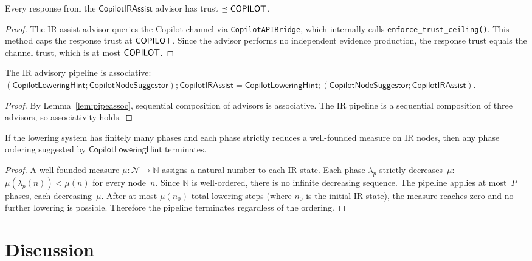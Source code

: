 \documentclass[11pt]{article}
\newcommand{\LowHint}{\mathsf{CopilotLoweringHint}}
\newcommand{\NodeSugg}{\mathsf{CopilotNodeSuggestor}}
\newcommand{\IRAssist}{\mathsf{CopilotIRAssist}}
\begin{document}
\begin{theorem}%
\label{thm:irassistceil}
Every response from the $\IRAssist$ advisor has trust
$\preceq \mathsf{COPILOT}$.
\end{theorem}
\begin{proof}
The IR assist advisor queries the Copilot channel via
\texttt{CopilotAPIBridge}, which internally calls
\texttt{enforce\_trust\_ceiling()}.  This method caps
the response trust at $\mathsf{COPILOT}$.  Since the advisor
performs no independent evidence production, the response
trust equals the channel trust, which is at most $\mathsf{COPILOT}$.
\end{proof}

\begin{theorem}%
\label{thm:compassoc}
The IR advisory pipeline is associative:
$(\LowHint \mathbin{;} \NodeSugg) \mathbin{;} \IRAssist
= \LowHint \mathbin{;} (\NodeSugg \mathbin{;} \IRAssist)$.
\end{theorem}
\begin{proof}
By Lemma~\ref{lem:pipeassoc}, sequential composition
of advisors is associative.  The IR pipeline is a
sequential composition of three advisors, so
associativity holds.
\end{proof}

\begin{theorem}%
\label{thm:phaseconv}
If the lowering system has finitely many phases and each
phase strictly reduces a well-founded measure on IR nodes,
then any phase ordering suggested by $\LowHint$ terminates.
\end{theorem}
\begin{proof}
A well-founded measure $\mu \colon \mathcal{N} \to \mathbb{N}$
assigns a natural number to each IR state.  Each phase
$\lambda_p$ strictly decreases~$\mu$:
$\mu(\lambda_p(n)) < \mu(n)$ for every node~$n$.
Since $\mathbb{N}$ is well-ordered, there is no infinite
decreasing sequence.  The pipeline applies at most~$P$
phases, each decreasing~$\mu$.  After at most $\mu(n_0)$
total lowering steps (where $n_0$ is the initial IR state),
the measure reaches zero and no further lowering is possible.
Therefore the pipeline terminates regardless of the ordering.
\end{proof}

\section{Discussion}\label{sec:discussion}
\end{document}
